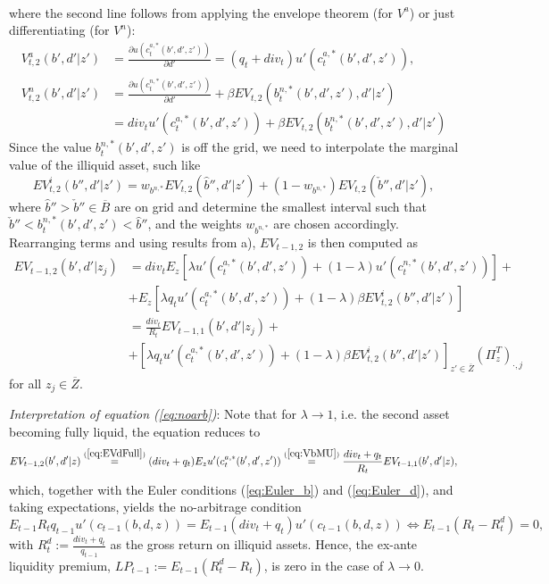 \documentclass[11pt]{article} %
\begin{document}
\begin{enumerate}[a.)]
\begin{align}
\end{align}
where the second line follows from applying the envelope theorem (for $V^a$) or just differentiating (for $V^n$):
\begin{align}
V^a_{t,2}(b',d'|z') &= \frac{\partial u(c_t^{a,*}(b',d',z'))}{\partial d'} = (q_t + div_t) u'(c^{a,*}_t(b',d',z')),\\
V^n_{t,2}(b',d'|z') &= \frac{\partial u(c_t^{n,*}(b',d',z'))}{\partial d'} + \beta EV_{t,2}(b^{n,*}_t(b',d',z'),d'|z')\\
&= div_t u'(c^{a,*}_t(b',d',z')) + \beta EV_{t,2}(b^{n,*}_t(b',d',z'),d'|z')
\end{align}
Since the value $b_t^{n,*}(b',d',z')$ is off the grid, we need to interpolate the marginal value of the illiquid asset, such like
\begin{equation}
EV_{t,2}^i(b'',d'|z') = w_{b^{n,*}} EV_{t,2}(\hat{b}'',d'|z') + (1-w_{b^{n,*}}) EV_{t,2}(\check{b}'',d'|z'),
\end{equation}
where $\hat{b}''>\check{b}''\in \overline{B}$ are on grid and determine the smallest interval such that $\check{b}''<b_t^{n,*}(b',d',z')<\hat{b}''$, and the weights $w_{b^{n,*}}$ are chosen accordingly. Rearranging terms and using results from a), $EV_{t-1,2}$ is then computed as
\begin{align}
EV_{t-1,2}(b',d'|z_j)& = div_t E_z[\lambda u'(c^{a,*}_t(b',d',z'))+(1-\lambda)u'(c^{n,*}_t(b',d',z'))] + \nonumber \\
&+ E_z  \left[ \lambda q_t u'(c_t^{a,*}(b',d',z')) + (1-\lambda) \beta EV^i_{t,2}(b'',d'|z') \right] \nonumber\\
&= \frac{div_t}{R_t} EV_{t-1,1}(b',d'|z_j)+\nonumber \\
&+ \left[ \lambda q_t u'(c_t^{a,*}(b',d',z')) + (1-\lambda) \beta EV^i_{t,2}(b'',d'|z') \right]_{z'\in \overline{Z}}\left(\Pi_z^T\right)_{\cdot,j} \label{eq:noarb} 
\end{align}
for all $z_j\in \overline{Z}$.
\end{enumerate}
\textit{Interpretation of equation (\ref{eq:noarb})}: Note that for $\lambda \rightarrow 1$, i.e. the second asset becoming fully liquid, the equation reduces to
\begin{equation}
EV_{t-1,2}(b',d'|z) \overset{(\ref{eq:EVdFull})}{=} (div_t + q_t) E_z u'(c^{a,*}_t(b',d',z')) \overset{(\ref{eq:VbMU})}{=} \frac{div_t+q_t}{R_t} EV_{t-1,1}(b',d'|z),
\end{equation}
which, together with the Euler conditions (\ref{eq:Euler_b}) and (\ref{eq:Euler_d}), and taking expectations, yields the no-arbitrage condition
\begin{equation}
E_{t-1} R_t q_{t-1} u'(c_{t-1}(b,d,z)) = E_{t-1} (div_t+q_t) u'(c_{t-1}(b,d,z)) \Leftrightarrow E_{t-1}\left(R_t -R_t^d\right)=0,
\end{equation}
with $R_t^d := \frac{div_t+q_t}{q_{t-1}}$ as the gross return on illiquid assets. Hence, the ex-ante liquidity premium, $LP_{t-1} := E_{t-1}\left( R_t^d - R_t\right)$, is zero in the case of $\lambda \rightarrow 0$.
\end{document}
